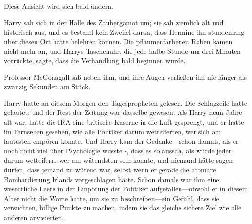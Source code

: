 Diese Ansicht wird sich bald ändern.

\later

Harry sah sich in der Halle des Zaubergamot um; sie sah ziemlich alt und historisch aus, und es bestand kein Zweifel daran, dass Hermine ihn stundenlang über diesen Ort hätte belehren können. Die pflaumenfarbenen Roben kamen nicht mehr an, und Harrys Taschenuhr, die jede halbe Stunde um drei Minuten vorrückte, sagte, dass die Verhandlung bald beginnen würde.

Professor McGonagall saß neben ihm, und ihre Augen verließen ihn nie länger als zwanzig Sekunden am Stück.

Harry hatte an diesem Morgen den Tagespropheten gelesen. Die Schlagzeile hatte gelautet:
und der Rest der Zeitung war dasselbe gewesen. Als Harry neun Jahre alt war, hatte die IRA eine britische Kaserne in die Luft gesprengt, und er hatte im Fernsehen gesehen, wie alle Politiker darum wetteiferten, wer sich am lautesten empören konnte. Und Harry kam der Gedanke—schon damals, als er noch nicht viel über Psychologie wusste -, dass es so aussah, als würde jeder darum wetteifern, wer am wütendsten sein konnte, und niemand hätte sagen dürfen, dass jemand zu wütend war, selbst wenn er gerade die atomare Bombardierung Irlands vorgeschlagen hätte. Schon damals war ihm eine wesentliche Leere in der Empörung der Politiker aufgefallen—obwohl er in diesem Alter nicht die Worte hatte, um sie zu beschreiben—ein Gefühl, dass sie versuchten, billige Punkte zu machen, indem sie das gleiche sichere Ziel wie alle anderen anvisierten.

